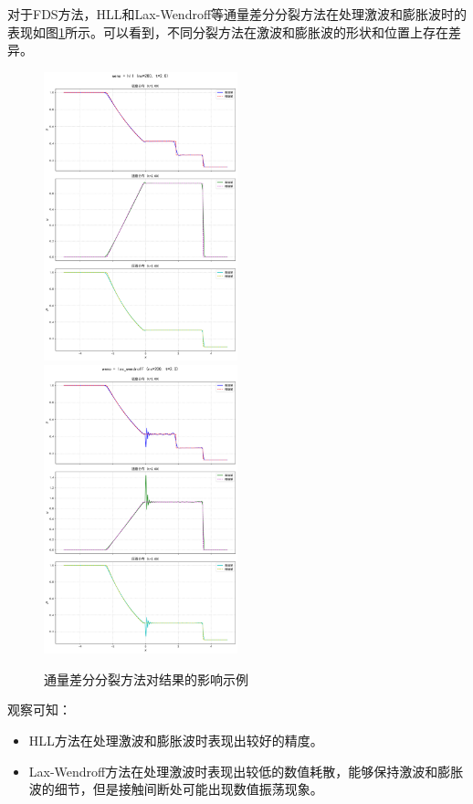 \documentclass[UTF8]{ctexart}
\begin{document}
对于FDS方法，HLL和Lax-Wendroff等通量差分分裂方法在处理激波和膨胀波时的表现如图\ref{fig:flux_diff_effect}所示。可以看到，不同分裂方法在激波和膨胀波的形状和位置上存在差异。
\begin{figure}
    \includegraphics[width=0.5\textwidth]{hll.png}
    \includegraphics[width=0.5\textwidth]{lax_wendroff.png}
    \caption{通量差分分裂方法对结果的影响示例}
    \label{fig:flux_diff_effect}
\end{figure}
观察可知：
\begin{itemize}
    \item HLL方法在处理激波和膨胀波时表现出较好的精度。
    \item Lax-Wendroff方法在处理激波时表现出较低的数值耗散，能够保持激波和膨胀波的细节，但是接触间断处可能出现数值振荡现象。
\end{itemize}
\end{document}
